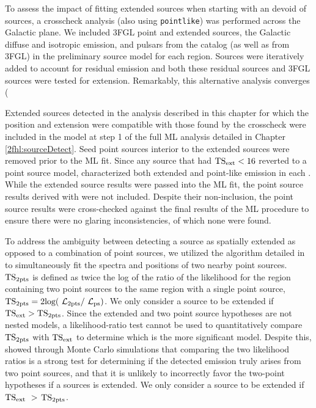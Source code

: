 { To assess the impact of fitting extended sources when starting with an \roi{} devoid of sources, a crosscheck analysis (also using {\tt pointlike}) was performed across the Galactic plane. We included 3FGL point and extended sources, the Galactic diffuse and isotropic emission, and pulsars from the \twopc{} catalog \citep{2PC} (as well as from 3FGL) in the preliminary source model for each region. Sources were iteratively added to account for residual emission and both these residual sources and 3FGL  sources were tested for extension. Remarkably, this alternative analysis converges (

Extended sources detected in the analysis described in this chapter for which the position and extension  were compatible with those found by the crosscheck were included in the \roi{} model at step 1 of the full ML analysis detailed in Chapter \ref{2fhl:sourceDetect}. Seed point sources interior to the extended sources were removed prior to the ML fit. Since any source that had ${\rm TS_{ext} < 16}$ reverted to a point source model, \srcs{} characterized  both extended and point-like emission in each \roi{}. While the extended source results were passed into the ML fit, the point source results derived with \ptlike{} were not included. Despite their non-inclusion, the point source results were cross-checked against the final results of the ML procedure  to ensure there were no glaring inconsistencies, of which none were found.

To address the ambiguity between detecting a source as spatially extended as opposed to a combination of point sources, we utilized the algorithm detailed in \cite{Lande12} to simultaneously fit the spectra and positions of two nearby point sources. ${\rm TS_{2pts}}$ is defined as twice the log of the ratio of the likelihood for the region containing two point sources to the same region with a single point source, ${\rm TS_{2pts} = 2log(~\mathrm{\mathcal{L}}{}_{2pts} /~\mathrm{\mathcal{L}}{}_{ps}})$. We only consider a source to be extended if ${\rm TS_{ext} > TS_{2pts}}$. Since the extended and two point source hypotheses are not nested models, a likelihood-ratio test cannot be used to quantitatively compare ${\rm TS_{2pts}}$ with ${\rm TS_{ext}}$ to determine which is the more significant model. Despite this, \cite{Lande12} showed through Monte Carlo simulations that comparing the two likelihood ratios is a strong test for determining if the detected emission truly arises from two point sources, and that it is unlikely to incorrectly favor the two-point hypotheses if a sources is extended. We only consider a source to be extended if $\rm TS_{ext}~ >$ $\rm TS_{2pts}$. 

}
